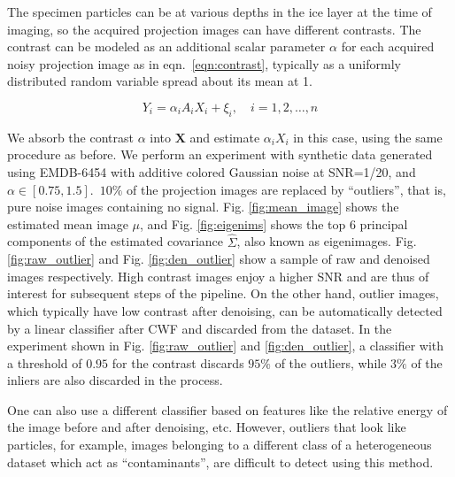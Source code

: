 \documentclass[review]{elsarticle}
\begin{document}
The specimen particles can be at various depths in the ice layer at the time of imaging, so the acquired
projection images can have different contrasts. The contrast can be modeled
as an additional scalar parameter $\alpha$ for each acquired noisy projection image as in eqn.\ \ref{eqn:contrast},
typically as a uniformly distributed random variable spread about its mean at 1.


\begin{equation}
 Y_i = \alpha_i A_i X_i + \xi_i, \quad i=1,2,\ldots,n
\label{eqn:contrast}
\end{equation}

We absorb the contrast $\alpha$ into $\textbf{X}$ and estimate $\alpha_i X_i$ in this case, using the same procedure as before.
We perform an experiment with synthetic data generated using EMDB-6454 with additive colored Gaussian noise at SNR=1/20, and $\alpha \in [0.75,1.5]$.\ $10\%$ of the
projection images are replaced by ``outliers'', that is, pure noise images containing no signal. 
Fig. \ref{fig:mean_image} shows the estimated mean image $\mu$, and Fig. \ref{fig:eigenims} shows the top 6 principal components
of the estimated covariance $\hat\Sigma$, also known as eigenimages. Fig. \ref{fig:raw_outlier} and Fig. \ref{fig:den_outlier} show 
a sample of raw and denoised images respectively. High contrast images enjoy a higher 
SNR and are thus of interest for subsequent steps of the pipeline. On the other hand, outlier images, which typically have low contrast
after denoising, can be automatically detected by a linear classifier
after CWF and discarded from the dataset. In the experiment shown in Fig. \ref{fig:raw_outlier} and \ref{fig:den_outlier}, a classifier
with a threshold of $0.95$ for the contrast discards $95\%$ of the outliers, while $3\%$ of the inliers are also discarded
in the process.

One can also use a different classifier based on features like the relative energy of the image before and after denoising, etc.
However, outliers that look like particles, for example, images belonging to a different class of a heterogeneous dataset which act as ``contaminants'',
are difficult to detect using this method.
\end{document}
